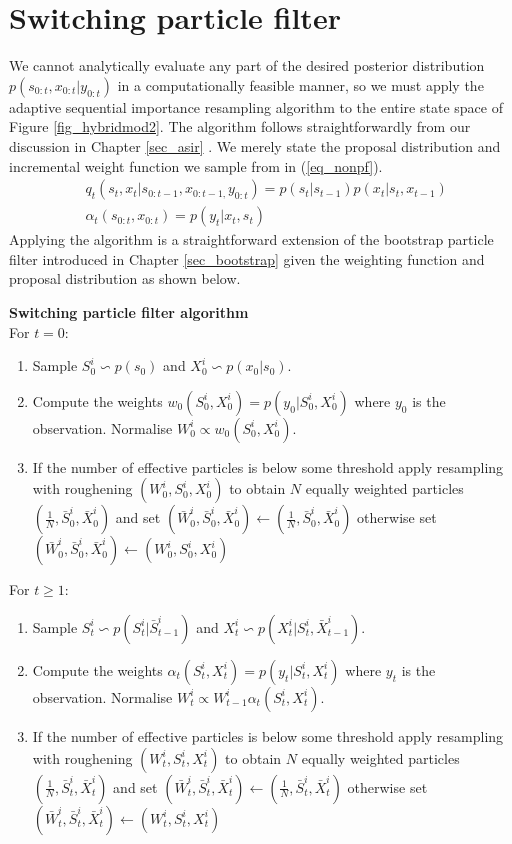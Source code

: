 \section{Switching particle filter}
We cannot analytically evaluate any part of the desired posterior distribution $p(s_{0:t}, x_{0:t}|y_{0:t})$ in a computationally feasible manner, so we must apply the adaptive sequential importance resampling algorithm to the entire state space of Figure \ref{fig_hybridmod2}. The algorithm follows straightforwardly from our discussion in Chapter \ref{sec_asir} \cite{murphy1}. We merely state the proposal distribution and incremental weight function we sample from in (\ref{eq_nonpf}). 
\begin{equation}
\begin{aligned}
&q_t(s_t,x_t|s_{0:t-1},x_{0:t-1,}y_{0:t}) = p(s_t|s_{t-1})p(x_t|s_t,x_{t-1}) \\
&\alpha_t(s_{0:t},x_{0:t}) = p(y_t|x_t,s_t)
\end{aligned}
\label{eq_nonpf}
\end{equation}  
Applying the algorithm is a straightforward extension of the bootstrap particle filter introduced in Chapter \ref{sec_bootstrap} given the weighting function and proposal distribution as shown below.

\textbf{Switching particle filter algorithm}\\
For $t=0$:
\begin{enumerate}
\item
Sample $S^i_0 \backsim p(s_0)$ and $X^i_0 \backsim p(x_0|s_0)$.
\item
Compute the weights $w_0(S_0^i, X_0^i) = p(y_0|S_0^i, X_0^i)$ where $y_0$ is the observation. Normalise $W^i_0 \propto w_0(S_0^i, X_0^i)$. 
\item
If the number of effective particles is below some threshold apply resampling with roughening $(W^i_0, S^i_0, X^i_0)$ to obtain $N$ equally weighted particles $(\frac{1}{N}, \bar{S}^i_0, \bar{X}^i_0)$ and set $(\bar{W}^i_0, \bar{S}^i_0,\bar{X}^i_0) \leftarrow (\frac{1}{N}, \bar{S}^i_0, \bar{X}^i_0)$ otherwise set $(\bar{W}^i_0,\bar{S}^i_0, \bar{X}^i_0) \leftarrow ({W}^i_0, S_0^i, {X}^i_0)$
\end{enumerate}
For $t \geq 1$:
\begin{enumerate}
\item
Sample $S^i_t \backsim p(S_t^i|\bar{S}^i_{t-1})$ and $X^i_t \backsim p(X^i_t|S^i_t, \bar{X}^i_{t-1})$.
\item
Compute the weights $\alpha_t(S_t^i, X_t^i) = p(y_t|S_t^i, X_t^i)$ where $y_t$ is the observation. Normalise $W^i_t \propto W^i_{t-1}\alpha_t(S_t^i, X_t^i)$.
\item
If the number of effective particles is below some threshold apply resampling with roughening $(W^i_t, S^i_t, X^i_t)$ to obtain $N$ equally weighted particles $(\frac{1}{N}, \bar{S}^i_t, \bar{X}^i_t)$ and set $(\bar{W}^i_t, \bar{S}^i_t,\bar{X}^i_t) \leftarrow (\frac{1}{N}, \bar{S}^i_t, \bar{X}^i_t)$ otherwise set $(\bar{W}^i_t,\bar{S}^i_t, \bar{X}^i_t) \leftarrow ({W}^i_t, S_t^i, {X}^i_t)$
\end{enumerate} 


